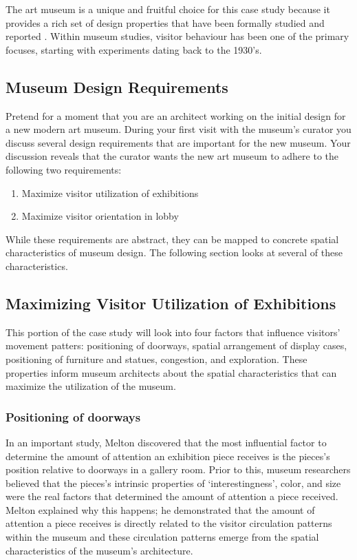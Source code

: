 \documentclass[12pt]{ucthesis}
\begin{document}
The art museum is a unique and fruitful choice for this case study because it provides a rich set of design properties that have been formally studied and reported \cite{Melton} \cite{Bitgood02} \cite{Falk}. Within museum studies, visitor behaviour has been one of the primary focuses, starting with experiments dating back to the 1930's. 

\subsection{Museum Design Requirements}
Pretend for a moment that you are an architect working on the initial design for a new modern art museum. During your first visit with the museum's curator you discuss several design requirements that are important for the new museum. Your discussion reveals that the curator wants the new art museum to adhere to the following two requirements:

\begin{enumerate}
\item Maximize visitor utilization of exhibitions
\item Maximize visitor orientation in lobby
\end{enumerate}

While these requirements are abstract, they can be mapped to concrete spatial characteristics of museum design. The following section looks at several of these characteristics.

\subsection{Maximizing Visitor Utilization of Exhibitions}
This portion of the case study will look into four factors that influence visitors' movement patters: positioning of doorways, spatial arrangement of display cases, positioning of furniture and statues, congestion, and exploration. These properties inform museum architects about the spatial characteristics that can maximize the utilization of the museum.


\subsubsection{Positioning of doorways}
In an important study, Melton \cite{Melton} discovered that the most influential factor to determine  the amount of attention an exhibition piece receives is the pieces's position relative to doorways in a gallery room. Prior to this, museum researchers believed that the pieces's intrinsic properties of `interestingness', color, and size were the real factors that determined the amount of attention a piece received. Melton explained why this happens; he demonstrated that the amount of attention a piece receives is directly related to the visitor circulation patterns within the museum and these circulation patterns emerge from the spatial characteristics of the museum's architecture.
\end{document}
